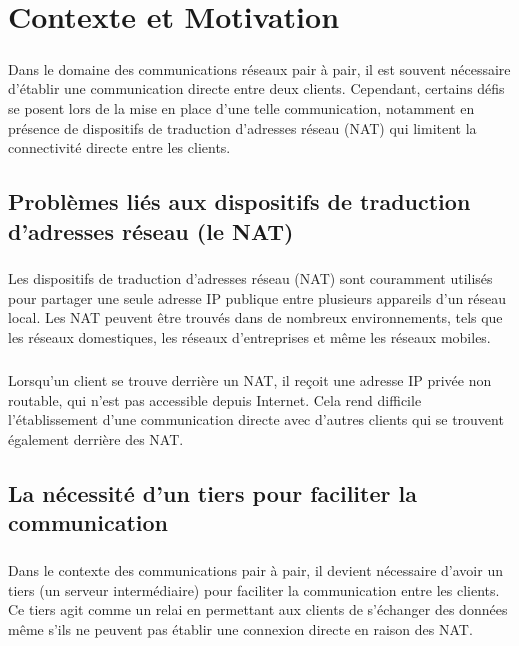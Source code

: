 \chapter{Contexte et Motivation}

\paragraph{}
Dans le domaine des communications réseaux pair à pair, il est souvent nécessaire d'établir une communication directe entre deux clients. Cependant, certains défis se 
posent lors de la mise en place d'une telle communication, notamment en présence de dispositifs de traduction d'adresses réseau (NAT) qui limitent la connectivité directe entre les clients.

\section{Problèmes liés aux dispositifs de traduction d'adresses réseau (le NAT)}

\paragraph{}
Les dispositifs de traduction d'adresses réseau (NAT) sont couramment utilisés pour partager une seule adresse IP publique entre plusieurs appareils d'un réseau local. Les NAT 
peuvent être trouvés dans de nombreux environnements, tels que les réseaux domestiques, les réseaux d'entreprises et même les réseaux mobiles.

\paragraph{}
Lorsqu'un client se trouve derrière un NAT, il reçoit une adresse IP privée non routable, qui n'est pas accessible depuis Internet. Cela rend difficile l'établissement 
d'une communication directe avec d'autres clients qui se trouvent également derrière des NAT.

\newpage
\section{La nécessité d'un tiers pour faciliter la communication}

\paragraph{}
Dans le contexte des communications pair à pair, il devient nécessaire d'avoir un tiers (un serveur intermédiaire) pour faciliter la communication entre les clients. 
Ce tiers agit comme un relai en permettant aux clients de s'échanger des données même s'ils ne peuvent pas établir une connexion directe en raison des NAT.

